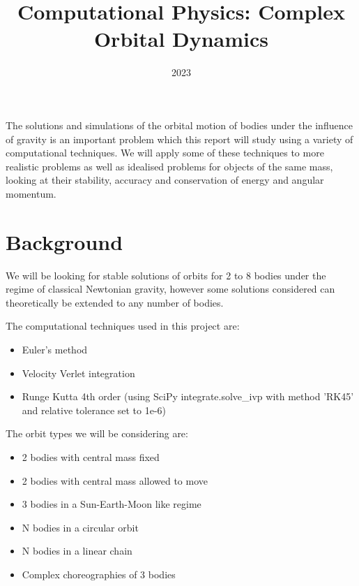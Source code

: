 \documentclass[11pt]{article}
\title{Computational Physics: \newline
Complex Orbital Dynamics}
\date{2023}
\begin{document}
\maketitle
\bigskip
\bigskip
\bigskip
\bigskip
\bigskip
\bigskip


\centering
\parbox{350pt}{
The solutions and simulations of the orbital motion of bodies under the influence of gravity is an important problem which this report will study using a variety of computational techniques. We will apply some of these techniques to more realistic problems as well as idealised problems for objects of the same mass, looking at their stability, accuracy and conservation of energy and angular momentum.
}



 
\newpage

\section{Background}
\raggedright
We will be looking for stable solutions of orbits for 2 to 8 bodies under the regime of classical Newtonian gravity, however some solutions considered can theoretically be extended to any number of bodies. 

\bigskip
The computational techniques used in this project are:
\begin{itemize}
\item Euler's method
\item Velocity Verlet integration
\item  Runge Kutta 4th order (using SciPy integrate.solve\_ivp with method 'RK45' and relative tolerance set to 1e-6)
\end{itemize}

\bigskip

The orbit types we will be considering are:
\begin{itemize}
\item 2 bodies with central mass fixed
\item 2 bodies with central mass allowed to move
\item 3 bodies in a Sun-Earth-Moon like regime
\item N bodies in a circular orbit
\item N bodies in a linear chain
\item Complex choreographies of 3 bodies
\end{itemize}
\end{document}
